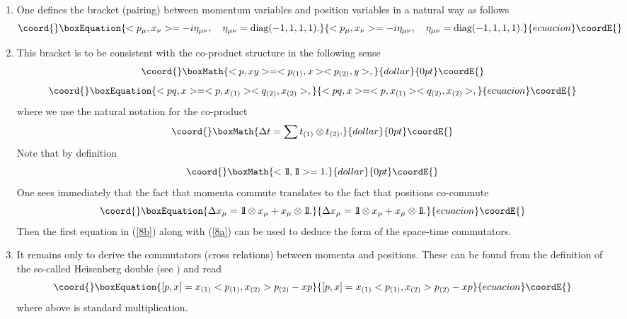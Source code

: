 \documentclass [prd,twocolumn,nofootinbib,showpacs]  {revtex4}
\def\bbbone{{\mathchoice {\rm 1\mskip-4mu l} {\rm 1\mskip-4mu l}
{\rm 1\mskip-4.5mu l} {\rm 1\mskip-5mu l}}}
\begin{document}
\begin{enumerate}
\item One defines the bracket (pairing) \myHighlight{$<\star, \star>$}\coordHE{} between momentum variables
\coordHE{} and position variables \coordHE{} in
a natural way as follows
\begin{equation}\coord{}\boxEquation{\label{8a}
 <p_\mu, x_\nu> =  -i \eta_{\mu\nu}, \quad \eta_{\mu\nu} = \mbox{diag}(-1,1,1,1).
}{<p_\mu, x_\nu> =  -i \eta_{\mu\nu}, \quad \eta_{\mu\nu} = \mbox{diag}(-1,1,1,1).
}{ecuacion}\coordE{}\end{equation}
\item This bracket is to be consistent with the co-product structure in the following sense
$$\coord{}\boxMath{
 <p, xy> = <p_{(1)}, x><p_{(2)}, y>,
}{dollar}{0pt}\coordE{}$$
 \begin{equation}\coord{}\boxEquation{\label{8b}
 <pq,x> =<p, x_{(1)}><q_{(2)}, x_{(2)}>,
}{<pq,x> =<p, x_{(1)}><q_{(2)}, x_{(2)}>,
}{ecuacion}\coordE{}\end{equation}
where we use the natural notation for the co-product $$\coord{}\boxMath{\Delta t = \sum
t_{(1)} \otimes t_{(2)}.}{dollar}{0pt}\coordE{}$$ Note that by
definition $$\coord{}\boxMath{<\bbbone, \bbbone> =1.}{dollar}{0pt}\coordE{}$$ One sees immediately that
the fact that momenta commute translates to the fact that
positions co-commute
\begin{equation}\coord{}\boxEquation{\label{8c}
  \Delta x_\mu = \bbbone \otimes x_\mu + x_\mu \otimes \bbbone.
}{\Delta x_\mu = \bbbone \otimes x_\mu + x_\mu \otimes \bbbone.
}{ecuacion}\coordE{}\end{equation}
Then the first equation in (\ref{8b}) along with (\ref{8a}) can be used to deduce the form of the space-time commutators.
\item  It remains only to derive the commutators (cross relations) between momenta and positions. These can be found
from the definition of the so-called Heisenberg double (see \cite{crossalg}) and read
\begin{equation}\coord{}\boxEquation{\label{8d}
 [p,x] =  x_{(1)}<p_{(1)}, x_{(2)}>p_{(2)}-xp
}{[p,x] =  x_{(1)}<p_{(1)}, x_{(2)}>p_{(2)}-xp
}{ecuacion}\coordE{}\end{equation}
where \coordHE{} above is standard multiplication.
\end{enumerate}
\end{document}
